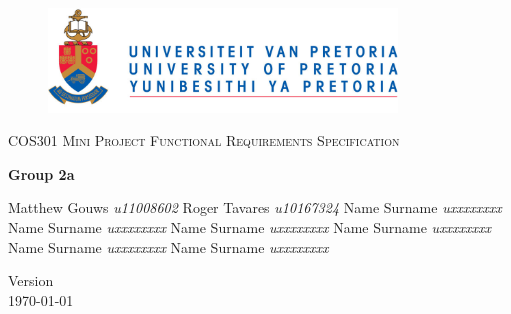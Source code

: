 \begin{titlepage}
\begin{center}

\begin{figure}[t]
	\centering
	\includegraphics[width=350px]{UP_Logo.png}
\end{figure}

\textsc{\LARGE COS301 Mini Project Functional \newline\newline Requirements Specification}

\textbf{\newline Group 2a} \\
\begin{flushright} \large
Matthew Gouws \emph{u11008602} \newline
Roger Tavares \emph{u10167324} \newline
Name Surname \emph{uxxxxxxxx} \newline
Name Surname \emph{uxxxxxxxx} \newline
Name Surname \emph{uxxxxxxxx} \newline
Name Surname \emph{uxxxxxxxx} \newline
Name Surname \emph{uxxxxxxxx} \newline
Name Surname \emph{uxxxxxxxx} \newline
\end{flushright}

\vfill

{\large Version}
\\
{\large \today}

\end{center}
\end{titlepage}

